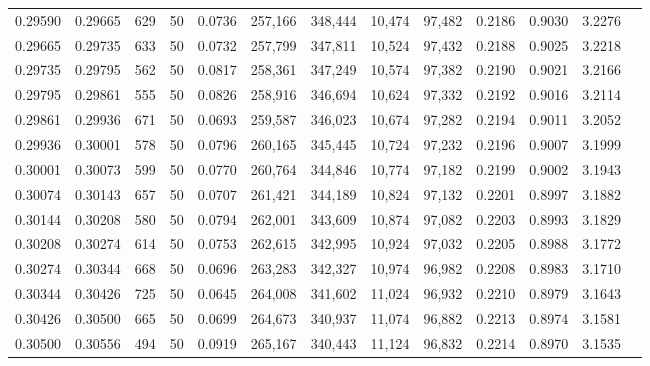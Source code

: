 \begin{tabular}{rrrrrrrrrrrrr}
0.29590 & 0.29665 &   629 &  50 &                                     0.0736 & 257,166 & 348,444 &  10,474 &  97,482 & 0.2186 & 0.9030 & 3.2276 \\
0.29665 & 0.29735 &   633 &  50 &                                     0.0732 & 257,799 & 347,811 &  10,524 &  97,432 & 0.2188 & 0.9025 & 3.2218 \\
0.29735 & 0.29795 &   562 &  50 &                                     0.0817 & 258,361 & 347,249 &  10,574 &  97,382 & 0.2190 & 0.9021 & 3.2166 \\
0.29795 & 0.29861 &   555 &  50 &                                     0.0826 & 258,916 & 346,694 &  10,624 &  97,332 & 0.2192 & 0.9016 & 3.2114 \\
0.29861 & 0.29936 &   671 &  50 &                                     0.0693 & 259,587 & 346,023 &  10,674 &  97,282 & 0.2194 & 0.9011 & 3.2052 \\
0.29936 & 0.30001 &   578 &  50 &                                     0.0796 & 260,165 & 345,445 &  10,724 &  97,232 & 0.2196 & 0.9007 & 3.1999 \\
0.30001 & 0.30073 &   599 &  50 &                                     0.0770 & 260,764 & 344,846 &  10,774 &  97,182 & 0.2199 & 0.9002 & 3.1943 \\
0.30074 & 0.30143 &   657 &  50 &                                     0.0707 & 261,421 & 344,189 &  10,824 &  97,132 & 0.2201 & 0.8997 & 3.1882 \\
0.30144 & 0.30208 &   580 &  50 &                                     0.0794 & 262,001 & 343,609 &  10,874 &  97,082 & 0.2203 & 0.8993 & 3.1829 \\
0.30208 & 0.30274 &   614 &  50 &                                     0.0753 & 262,615 & 342,995 &  10,924 &  97,032 & 0.2205 & 0.8988 & 3.1772 \\
0.30274 & 0.30344 &   668 &  50 &                                     0.0696 & 263,283 & 342,327 &  10,974 &  96,982 & 0.2208 & 0.8983 & 3.1710 \\
0.30344 & 0.30426 &   725 &  50 &                                     0.0645 & 264,008 & 341,602 &  11,024 &  96,932 & 0.2210 & 0.8979 & 3.1643 \\
0.30426 & 0.30500 &   665 &  50 &                                     0.0699 & 264,673 & 340,937 &  11,074 &  96,882 & 0.2213 & 0.8974 & 3.1581 \\
0.30500 & 0.30556 &   494 &  50 &                                     0.0919 & 265,167 & 340,443 &  11,124 &  96,832 & 0.2214 & 0.8970 & 3.1535 \\

\end{tabular}

